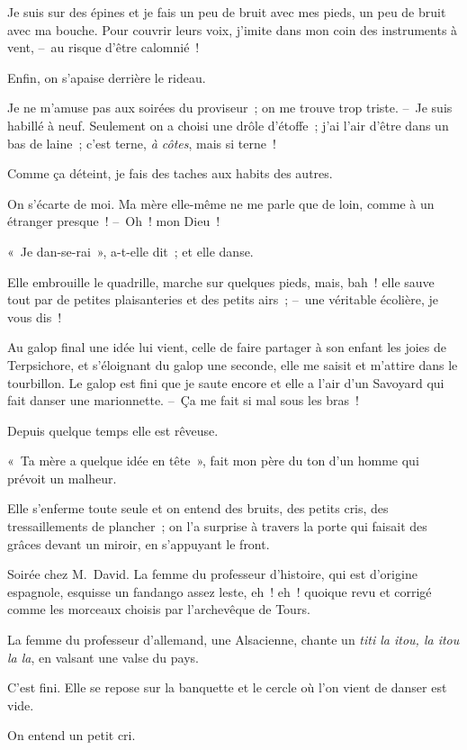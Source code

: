\documentclass[french,twoside]{book} %
\begin{document}
Je suis sur des épines et je fais un peu de bruit avec mes pieds, un peu de bruit avec ma bouche. Pour couvrir leurs voix, j’imite dans mon coin des instruments à vent, – au risque d’être calomnié !\par
Enfin, on s’apaise derrière le rideau.\par
\bigbreak
\noindent Je ne m’amuse pas aux soirées du proviseur ; on me trouve trop triste. – Je suis habillé à neuf. Seulement on a choisi une drôle d’étoffe ; j’ai l’air d’être dans un bas de laine ; c’est terne, \emph{à côtes}, mais si terne !\par
Comme ça déteint, je fais des taches aux habits des autres.\par
On s’écarte de moi. Ma mère elle-même ne me parle que de loin, comme à un étranger presque ! – Oh ! mon Dieu !\par
\bigbreak
\noindent « Je dan-se-rai », a-t-elle dit ; et elle danse.\par
Elle embrouille le quadrille, marche sur quelques pieds, mais, bah ! elle sauve tout par de petites plaisanteries et des petits airs ; – une véritable écolière, je vous dis !\par
Au galop final une idée lui vient, celle de faire partager à son enfant les joies de Terpsichore, et s’éloignant du galop une seconde, elle me saisit et m’attire dans le tourbillon. Le galop est fini que je saute encore et elle a l’air d’un Savoyard qui fait danser une marionnette. – Ça me fait si mal sous les bras !\par
Depuis quelque temps elle est rêveuse.\par
« Ta mère a quelque idée en tête », fait mon père du ton d’un homme qui prévoit un malheur.\par
Elle s’enferme toute seule et on entend des bruits, des petits cris, des tressaillements de plancher ; on l’a surprise à travers la porte qui faisait des grâces devant un miroir, en s’appuyant le front.\par
Soirée chez M. David. La femme du professeur d’histoire, qui est d’origine espagnole, esquisse un fandango assez leste, eh ! eh ! quoique revu et corrigé comme les morceaux choisis par l’archevêque de Tours.\par
La femme du professeur d’allemand, une Alsacienne, chante un \emph{titi la itou, la itou la la}, en valsant une valse du pays.\par
C’est fini. Elle se repose sur la banquette et le cercle où l’on vient de danser est vide.\par
On entend un petit cri.\par
\end{document}
